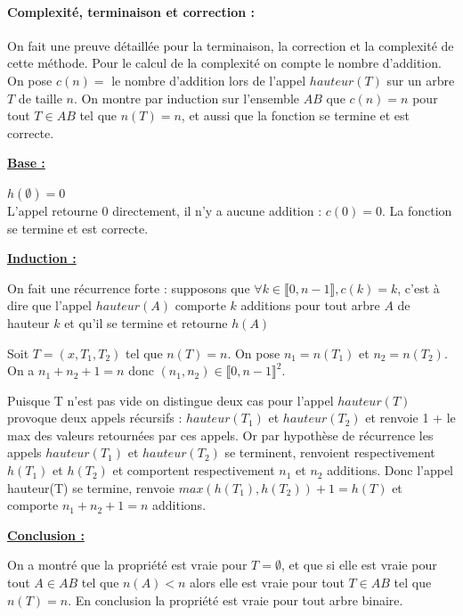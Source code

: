 \documentclass{report}
\begin{document}
\paragraph{Complexité, terminaison et correction :} On fait une preuve détaillée pour la terminaison, la correction et la complexité de cette méthode.
Pour le calcul de la complexité on compte le nombre d'addition. On pose $c(n) = $ le nombre d'addition lors de l'appel $hauteur(T)$ sur un arbre $T$ de taille $n$. On montre par induction sur l'ensemble $AB$ que $c(n) = n$ pour tout $T \in AB$ tel que $n(T) = n$, et aussi que la fonction se termine et est correcte.

\begin{flushleft}
    \bf
    \underline{Base :}
    
\end{flushleft}
$h(\emptyset) = 0$ \\ 
L'appel retourne $0$ directement, il n'y a aucune addition : $c(0) = 0$. La fonction se termine et est correcte.
\begin{flushleft}
    \bf
    \underline{Induction :}
\end{flushleft}
On fait une récurrence forte : supposons que $\forall k \in \llbracket 0, n-1 \rrbracket, c(k) = k$, c'est à dire que l'appel $hauteur(A)$ comporte $k$ additions pour tout arbre $A$ de hauteur $k$ et qu'il se termine et retourne $h(A)$

Soit $T = (x,T_1,T_2)$ tel que $n(T) = n$. On pose $n_1 = n(T_1)$ et $n_2=n(T_2)$. On a $n_1 + n_2 + 1 = n$ donc $(n_1,n_2) \in {\llbracket 0, n-1 \rrbracket}^2$. 

Puisque T n'est pas vide on distingue deux cas pour l'appel $hauteur(T)$ provoque deux appels récursifs : $hauteur(T_1)$ et $hauteur(T_2)$ et renvoie 1 + le max des valeurs retournées par ces appels. Or par hypothèse de récurrence les appels $hauteur(T_1)$ et $hauteur(T_2)$ se terminent, renvoient respectivement $h(T_1)$ et $h(T_2)$ et comportent respectivement $n_1$ et $n_2$ additions. Donc l'appel hauteur(T) se termine, renvoie $max(h(T_1),h(T_2))+1 = h(T)$ et comporte $n_1 + n_2 + 1 = n$ additions.
\begin{flushleft}
    \bf
    \underline{Conclusion :}
\end{flushleft}

On a montré que la propriété est vraie pour $T = \emptyset$, et que si elle est vraie pour tout $A \in AB$ tel que $n(A) < n$ alors elle est vraie pour tout $T \in AB$ tel que $n(T) = n$. En conclusion la propriété est vraie pour tout arbre binaire.
\end{document}
